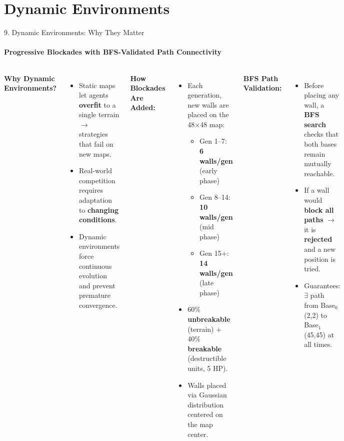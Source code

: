 \documentclass[aspectratio=169, 11pt]{beamer}
\begin{document}
\section{Dynamic Environments}
\begin{frame}{9. Dynamic Environments: Why They Matter}
    \framesubtitle{Progressive Blockades with BFS-Validated Path Connectivity}

    \begin{columns}[T]
        \textbf{\textcolor{amritaMaroon}{Why Dynamic Environments?}}
        \begin{itemize}\small
            \item Static maps let agents \textbf{overfit} to a single terrain $\rightarrow$ strategies that fail on new maps.
            \item Real-world competition requires adaptation to \textbf{changing conditions}.
            \item Dynamic environments force continuous evolution and prevent premature convergence.
        \end{itemize}

        \vspace{0.2cm}
        \textbf{\textcolor{amritaMaroon}{How Blockades Are Added:}}
        \begin{itemize}\small
            \item Each generation, new walls are placed on the 48$\times$48 map:
            \begin{itemize}\footnotesize
                \item Gen 1--7: \textbf{6 walls/gen} (early phase)
                \item Gen 8--14: \textbf{10 walls/gen} (mid phase)
                \item Gen 15+: \textbf{14 walls/gen} (late phase)
            \end{itemize}
            \item 60\% \textbf{unbreakable} (terrain) + 40\% \textbf{breakable} (destructible units, 5 HP).
            \item Walls placed via Gaussian distribution centered on the map center.
        \end{itemize}

        \textbf{\textcolor{amritaMaroon}{BFS Path Validation:}}
        \begin{itemize}\small
            \item Before placing any wall, a \textbf{BFS search} checks that both bases remain mutually reachable.
            \item If a wall would \textbf{block all paths} $\rightarrow$ it is \textbf{rejected} and a new position is tried.
            \item Guarantees: $\exists$ path from Base$_0$ (2,2) to Base$_1$ (45,45) at all times.
        \end{itemize}


\end{columns}
\end{frame}
\end{document}
